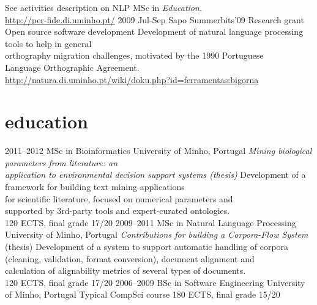 \documentclass[a4paper]{friggeri-cv}
\begin{document}
\begin{entrylist}
    {See activities description on NLP MSc in \emph{Education}.\\
    \url{http://per-fide.di.uminho.pt/}}
  \entry
    {2009 {\footnotesize Jul-Sep}}
    {Sapo Summerbits'09}
    {Research grant}
    {Open source software development}
    {
        Development of natural language processing tools to help in general\\
        orthography migration challenges, motivated by the 1990 Portuguese\\
        Language Orthographic Agreement.\\
        \url{http://natura.di.uminho.pt/wiki/doku.php?id=ferramentas:bigorna}
    }
\end{entrylist}



\newpage
\section{education}
\label{education}

\begin{entrylist}
  \entry
    {2011--2012}
    {MSc in Bioinformatics}
    {University of Minho, Portugal}
    {\emph{Mining biological parameters from literature: an\\
    application to environmental decision support systems (thesis)}}
    {Development of a framework
    for building text mining applications\\
    for scientific literature, focused on numerical parameters and\\
    supported by 3rd-party tools and expert-curated
    ontologies.\\
    120 ECTS, final grade 17/20
    }
  \entry
    {2009--2011}
    {MSc in Natural Language Processing}
    {University of Minho, Portugal}
    {\emph{Contributions for building a Corpora-Flow System} (thesis)}
    {\footnotesize{Development of a system to support automatic handling of corpora\\
    (cleaning, validation, format conversion), document alignment and\\
    calculation of alignability metrics of several types of documents.}\\
    120 ECTS, final grade 17/20
    }
  \entry
    {2006--2009}
    {BSc in Software Engineering}
    {University of Minho, Portugal}
    {Typical CompSci course}
    {180 ECTS, final grade 15/20}
\end{entrylist}
\end{document}
